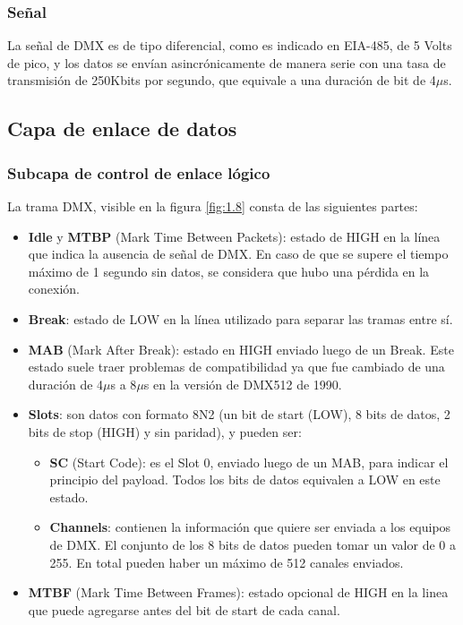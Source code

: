 \subsubsection{Señal}
La señal de DMX es de tipo diferencial, como es indicado en EIA-485, de 5 Volts de pico, y los datos se envían asincrónicamente de manera serie con una tasa de transmisión de 250Kbits por segundo, que equivale a una duración de bit de 4\(\mu \)s.

\newpage
\subsection{Capa de enlace de datos}
\subsubsection{Subcapa de control de enlace lógico}
La trama DMX, visible en la figura \ref{fig:1.8} consta de las siguientes partes:

\begin{itemize}
	\item \textbf{Idle} y \textbf{MTBP} (Mark Time Between Packets): estado de HIGH en la línea que indica la ausencia de señal de DMX. En caso de que se supere el tiempo máximo de 1 segundo sin datos, se considera que hubo una pérdida en la conexión.
	\item \textbf{Break}: estado de LOW en la línea utilizado para separar las tramas entre sí.
	\item \textbf{MAB} (Mark After Break): estado en HIGH enviado luego de un Break. Este estado suele traer problemas de compatibilidad ya que fue cambiado de una duración de 4\(\mu \)s a 8\(\mu \)s en la versión de DMX512 de 1990.
	\item \textbf{Slots}: son datos con formato 8N2 (un bit de start (LOW), 8 bits de datos, 2 bits de stop (HIGH) y sin paridad), y pueden ser:
	\begin{itemize}
		\item \textbf{SC} (Start Code): es el Slot 0, enviado luego de un MAB, para indicar el principio del payload. Todos los bits de datos equivalen a LOW en este estado.
		\item \textbf{Channels}: contienen la información que quiere ser enviada a los equipos de DMX. El conjunto de los 8 bits de datos pueden tomar un valor de 0 a 255. En total pueden haber un máximo de 512 canales enviados.
	\end{itemize}
	\item \textbf{MTBF} (Mark Time Between Frames): estado opcional de HIGH en la linea que puede agregarse antes del bit de start de cada canal.
\end{itemize}



